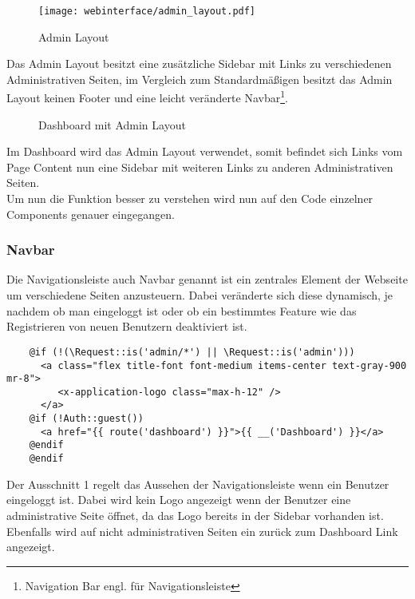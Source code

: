 \begin{figure}[H]
  \centering
  \texttt{[image: webinterface/admin\_layout.pdf]}
  \caption{Admin Layout}
\end{figure}

Das Admin Layout besitzt eine zusätzliche Sidebar mit Links zu verschiedenen
Administrativen Seiten, im Vergleich zum Standardmäßigen besitzt das Admin
Layout keinen Footer und eine leicht veränderte Navbar\footnote{Navigation Bar
engl. für Navigationsleiste}.

\begin{figure}[H]
  \centering
  \caption{Dashboard mit Admin Layout}
\end{figure}

Im Dashboard wird das Admin Layout verwendet, somit befindet sich Links vom Page
Content nun eine Sidebar mit weiteren Links zu anderen Administrativen Seiten.\\

Um nun die Funktion besser zu verstehen wird nun auf den Code einzelner Components genauer
eingegangen.

\subsubsection{Navbar}
Die Navigationsleiste auch Navbar genannt ist ein zentrales Element der Webseite
um verschiedene Seiten anzusteuern. Dabei veränderte sich diese dynamisch, je
nachdem ob man eingeloggt ist oder ob ein bestimmtes Feature wie das
Registrieren von neuen Benutzern deaktiviert ist.

\begin{listing}[H]
  \begin{verbatim}
    @if (!(\Request::is('admin/*') || \Request::is('admin')))
      <a class="flex title-font font-medium items-center text-gray-900 mr-8">
         <x-application-logo class="max-h-12" />
      </a>
    @if (!Auth::guest())
      <a href="{{ route('dashboard') }}">{{ __('Dashboard') }}</a>
    @endif
    @endif
  \end{verbatim}
  \caption{Ausschnitt 1 navigation.blade.php}
\end{listing}

Der Ausschnitt 1 regelt das Aussehen der Navigationsleiste wenn ein Benutzer
eingeloggt ist. Dabei wird kein Logo angezeigt wenn der Benutzer eine
administrative Seite öffnet, da das Logo bereits in der
Sidebar vorhanden ist. Ebenfalls wird auf nicht administrativen Seiten ein
zurück zum Dashboard Link angezeigt.

